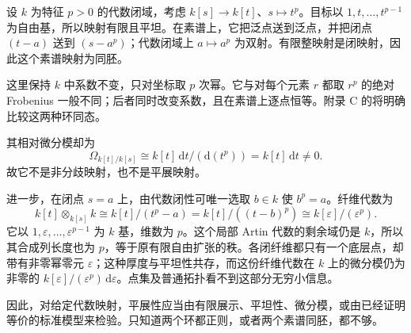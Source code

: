 \begin{example}\label{b3:exm:frobenius-homeomorphism-not-etale}
	设 \(k\) 为特征 \(p>0\) 的代数闭域，考虑 \(k[s]\to k[t]\)、\(s\mapsto t^p\)。目标以 \(1,t,\ldots,t^{p-1}\) 为自由基，所以映射有限且平坦。在素谱上，它把泛点送到泛点，并把闭点 \((t-a)\) 送到 \((s-a^p)\)；代数闭域上 \(a\mapsto a^p\) 为双射。有限整映射是闭映射，因此这个素谱映射为同胚。

	\ProseParagraphBreak
	这里保持 \(k\) 中系数不变，只对坐标取 \(p\) 次幂。它与对每个元素 \(r\) 都取 \(r^p\) 的绝对 Frobenius 一般不同；后者同时改变系数，且在素谱上逐点恒等。附录 C 的将明确比较这两种环同态。

	\ProseParagraphBreak
	其相对微分模却为
	\[
		\Omega_{k[t]/k[s]} \cong k[t]\,\mathrm{d}t/(\mathrm{d}(t^p))=k[t]\,\mathrm{d}t\ne0.
	\]
	故它不是非分歧映射，也不是平展映射。

	\ProseParagraphBreak
	进一步，在闭点 \(s=a\) 上，由代数闭性可唯一选取 \(b\in k\) 使 \(b^p=a\)。纤维代数为
	\[
		k[t]\otimes_{k[s]}k \cong k[t]/(t^p-a) =k[t]/((t-b)^p) \cong k[\varepsilon]/(\varepsilon^p).
	\]
	它以 \(1,\varepsilon,\ldots,\varepsilon^{p-1}\) 为 \(k\) 基，维数为 \(p\)。这个局部 Artin 代数的剩余域仍是 \(k\)，所以其合成列长度也为 \(p\)，等于原有限自由扩张的秩。各闭纤维都只有一个底层点，却带有非零幂零元 \(\varepsilon\)；这种厚度与平坦性共存，而这份纤维代数在 \(k\) 上的微分模仍为非零的 \(k[\varepsilon]/(\varepsilon^p)\,\mathrm{d}\varepsilon\)。点集及普通拓扑看不到这部分无穷小信息。
\end{example}

因此，对给定代数映射，平展性应当由有限展示、平坦性、微分模，或由已经证明等价的标准模型来检验。只知道两个环都正则，或者两个素谱同胚，都不够。

